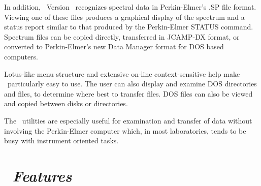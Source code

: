 In addition, \RD\ Version \SP\ recognizes spectral data in
Perkin-Elmer's .SP file format.  Viewing one of these files produces
a graphical display of the spectrum and a status report similar to
that produced by the Perkin-Elmer STATUS command.  Spectrum files can
be copied directly, transferred in JCAMP-DX format, or converted to
Perkin-Elmer's new Data Manager format for DOS based computers.
 
Lotus-like menu structure and extensive on-line context-sensitive
help make \RD\ particularly easy to use.  The user can also
display and examine DOS directories and files, to determine where
best to transfer files.  DOS files can also be viewed and copied
between disks or directories.
 
The \RD\ utilities are especially useful for examination and transfer of
data without involving the Perkin-Elmer computer which, in most
laboratories, tends to be busy with instrument oriented tasks.
 
\newpage
 
\section*{{\sl \RD\ Features}}
 
